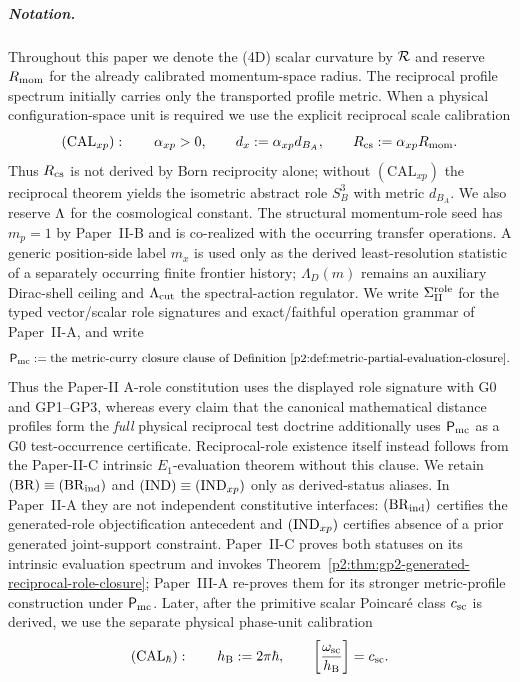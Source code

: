 \documentclass[12pt,a4paper]{article}
\begin{document}
\subparagraph{Notation.} Throughout this paper we denote the (4D) scalar
curvature by $\mathcal R$ and reserve $R_{\mathrm{mom}}$ for the already calibrated momentum-space
radius.  The reciprocal profile spectrum initially carries only the transported
profile metric.  When a physical configuration-space unit is required we use the
explicit reciprocal scale calibration
\[
 (\mathrm{CAL}_{xp}):\qquad
 \alpha_{xp}>0,\qquad d_x:=\alpha_{xp}d_{B_A},\qquad
 R_{\mathrm{cs}}:=\alpha_{xp}R_{\mathrm{mom}}.
\]
Thus $R_{\mathrm{cs}}$ is not derived by Born reciprocity alone; without
$(\mathrm{CAL}_{xp})$ the reciprocal theorem yields the isometric abstract role
$S^3_B$ with metric $d_{B_A}$.  We also reserve $\Lambda$ for the cosmological
constant.  The structural momentum-role seed has $m_p=1$ by Paper~II-B and is
co-realized with the occurring transfer operations.  A
generic position-side label $m_x$ is used only as the derived least-resolution
statistic of a separately occurring finite frontier history; $\Lambda_D(m)$ remains an auxiliary Dirac-shell ceiling
and $\Lambda_{\mathrm{cut}}$ the spectral-action regulator.  We write $\Sigma_{\rm II}^{\rm role}$ for the
typed vector/scalar role signatures and exact/faithful operation grammar of
Paper~II-A, and write
\[
 \mathsf P_{\rm mc}
 :=
 \text{the metric-curry closure clause of
 Definition~\ref{p2:def:metric-partial-evaluation-closure}}.
\]
Thus the Paper-II A-role constitution uses the displayed role signature with
G0 and GP1--GP3, whereas every claim that the canonical mathematical distance
profiles form the \emph{full} physical reciprocal test doctrine additionally
uses $\mathsf P_{\rm mc}$ as a G0 test-occurrence certificate.  Reciprocal-role
existence itself instead follows from the Paper-II-C intrinsic
\(E_1\)-evaluation theorem without this clause.  We retain
$({\rm BR})\equiv(\mathrm{BR}_{\rm ind})$ and
$({\rm IND})\equiv(\mathrm{IND}_{xp})$ only as derived-status aliases.  In Paper~II-A they are not independent constitutive
interfaces: $({\rm BR}_{\rm ind})$ certifies the generated-role
objectification antecedent and $({\rm IND}_{xp})$ certifies absence of a
prior generated joint-support constraint.  Paper~II-C proves both statuses on
its intrinsic evaluation spectrum and invokes
Theorem~\ref{p2:thm:gp2-generated-reciprocal-role-closure}; Paper~III-A
re-proves them for its stronger metric-profile construction under
$\mathsf P_{\rm mc}$.  Later,
after the primitive scalar Poincar\'e class $c_{\rm sc}$ is derived, we use
the separate physical phase-unit calibration
\[
 (\mathrm{CAL}_{\hbar}):\qquad
 h_{\mathrm B}:=2\pi\hbar,\qquad
 \left[\frac{\omega_{\rm sc}}{h_{\mathrm B}}\right]=c_{\rm sc}.
\]
\end{document}
